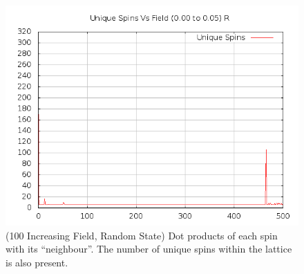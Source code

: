 \documentclass{article}
\begin{document}
\begin{center}
\begin{figure}
\centering
\includegraphics[scale=0.5]{100/000to005RFreq.png}
\caption{(100 Increasing Field, Random State) Dot products of each spin with its ``neighbour''.
The number of unique spins within the lattice is also present.}
\end{figure}
\end{center}
\clearpage
\end{document}
